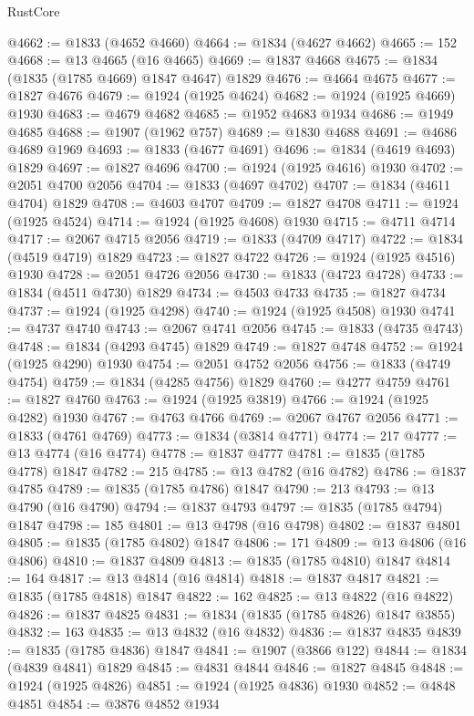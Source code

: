\begin{lexlean}{RustCore}
\begin{coremodule}
@4662 := @1833 (@4652 @4660)
@4664 := @1834 (@4627 @4662)
@4665 := 152
@4668 := @13 @4665 (@16 @4665)
@4669 := @1837 @4668
@4675 := @1834 (@1835 (@1785 @4669) @1847 @4647) @1829
@4676 := @4664 @4675
@4677 := @1827 @4676
@4679 := @1924 (@1925 @4624)
@4682 := @1924 (@1925 @4669) @1930
@4683 := @4679 @4682
@4685 := @1952 @4683 @1934
@4686 := @1949 @4685
@4688 := @1907 (@1962 @757)
@4689 := @1830 @4688
@4691 := @4686 @4689 @1969
@4693 := @1833 (@4677 @4691)
@4696 := @1834 (@4619 @4693) @1829
@4697 := @1827 @4696
@4700 := @1924 (@1925 @4616) @1930
@4702 := @2051 @4700 @2056
@4704 := @1833 (@4697 @4702)
@4707 := @1834 (@4611 @4704) @1829
@4708 := @4603 @4707
@4709 := @1827 @4708
@4711 := @1924 (@1925 @4524)
@4714 := @1924 (@1925 @4608) @1930
@4715 := @4711 @4714
@4717 := @2067 @4715 @2056
@4719 := @1833 (@4709 @4717)
@4722 := @1834 (@4519 @4719) @1829
@4723 := @1827 @4722
@4726 := @1924 (@1925 @4516) @1930
@4728 := @2051 @4726 @2056
@4730 := @1833 (@4723 @4728)
@4733 := @1834 (@4511 @4730) @1829
@4734 := @4503 @4733
@4735 := @1827 @4734
@4737 := @1924 (@1925 @4298)
@4740 := @1924 (@1925 @4508) @1930
@4741 := @4737 @4740
@4743 := @2067 @4741 @2056
@4745 := @1833 (@4735 @4743)
@4748 := @1834 (@4293 @4745) @1829
@4749 := @1827 @4748
@4752 := @1924 (@1925 @4290) @1930
@4754 := @2051 @4752 @2056
@4756 := @1833 (@4749 @4754)
@4759 := @1834 (@4285 @4756) @1829
@4760 := @4277 @4759
@4761 := @1827 @4760
@4763 := @1924 (@1925 @3819)
@4766 := @1924 (@1925 @4282) @1930
@4767 := @4763 @4766
@4769 := @2067 @4767 @2056
@4771 := @1833 (@4761 @4769)
@4773 := @1834 (@3814 @4771)
@4774 := 217
@4777 := @13 @4774 (@16 @4774)
@4778 := @1837 @4777
@4781 := @1835 (@1785 @4778) @1847
@4782 := 215
@4785 := @13 @4782 (@16 @4782)
@4786 := @1837 @4785
@4789 := @1835 (@1785 @4786) @1847
@4790 := 213
@4793 := @13 @4790 (@16 @4790)
@4794 := @1837 @4793
@4797 := @1835 (@1785 @4794) @1847
@4798 := 185
@4801 := @13 @4798 (@16 @4798)
@4802 := @1837 @4801
@4805 := @1835 (@1785 @4802) @1847
@4806 := 171
@4809 := @13 @4806 (@16 @4806)
@4810 := @1837 @4809
@4813 := @1835 (@1785 @4810) @1847
@4814 := 164
@4817 := @13 @4814 (@16 @4814)
@4818 := @1837 @4817
@4821 := @1835 (@1785 @4818) @1847
@4822 := 162
@4825 := @13 @4822 (@16 @4822)
@4826 := @1837 @4825
@4831 := @1834 (@1835 (@1785 @4826) @1847 @3855)
@4832 := 163
@4835 := @13 @4832 (@16 @4832)
@4836 := @1837 @4835
@4839 := @1835 (@1785 @4836) @1847
@4841 := @1907 (@3866 @122)
@4844 := @1834 (@4839 @4841) @1829
@4845 := @4831 @4844
@4846 := @1827 @4845
@4848 := @1924 (@1925 @4826)
@4851 := @1924 (@1925 @4836) @1930
@4852 := @4848 @4851
@4854 := @3876 @4852 @1934

\end{coremodule}
\end{lexlean}
